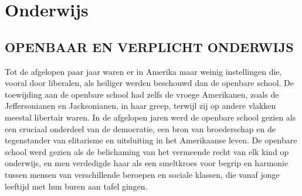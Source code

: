 \documentclass[
  a5paper,
  smalldemyvopaper,10pt,twoside,onecolumn,openright,extrafontsizes,hidelinks]{memoir}
\begin{document}

\chapter{Onderwijs}\label{onderwijs}

\section{OPENBAAR EN VERPLICHT
ONDERWIJS}\label{openbaar-en-verplicht-onderwijs}

Tot de afgelopen paar jaar waren er in Amerika maar weinig instellingen
die, vooral door liberalen, als heiliger werden beschouwd dan de
openbare school. De toewijding aan de openbare school had zelfs de
vroege Amerikanen, zoals de Jeffersonianen en Jacksonianen, in haar
greep, terwijl zij op andere vlakken meestal libertair waren. In de
afgelopen jaren werd de openbare school gezien als een cruciaal
onderdeel van de democratie, een bron van broederschap en de
tegenstander van elitarisme en uitsluiting in het Amerikaanse leven. De
openbare school werd gezien als de belichaming van het vermeende recht
van elk kind op onderwijs, en men verdedigde haar als een smeltkroes
voor begrip en harmonie tussen mensen van verschillende beroepen en
sociale klassen, die vanaf jonge leeftijd met hun buren aan tafel
gingen.
\end{document}
